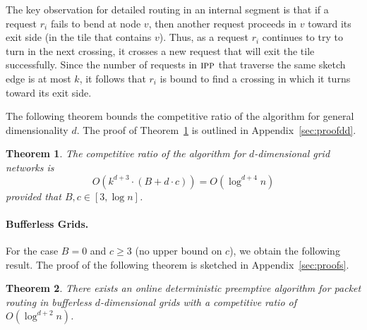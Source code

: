 \documentclass[11pt]{article}
\newtheorem{theorem}{Theorem}
\newcommand{\route}{\text{\sc{ipp}}}
\newcommand{\IPP}{\route}
\newenvironment{proof sketch}[1]{\noindent {\emph{Proof sketch of #1:}}}{\hfill \qed}
\begin{document}
\begin{enumerate}[(1)]
  The key observation for detailed routing in an internal segment is that if a
  request $r_i$ fails to bend at node $v$, then another request proceeds in $v$
  toward its exit side (in the tile that contains $v$). Thus, as a request $r_i$
  continues to try to turn in the next crossing, it crosses a new request that will
  exit the tile successfully. Since the number of requests in $\IPP$ that traverse the same sketch edge is at most $k$, it follows that $r_i$ is bound to find a crossing in which it turns
  toward its exit side.

\end{enumerate}
The following theorem bounds the competitive ratio of the algorithm for general dimensionality $d$. The proof of Theorem~\ref{thm:algd} is outlined in Appendix~\ref{sec:proofdd}.

\begin{theorem}\label{thm:algd}
  The competitive ratio of the algorithm for $d$-dimensional grid
networks is $$O\left(k^{d+3} \cdot(B+d\cdot c) \right)=O\left(
\log^{d+4} n \right)$$ provided that $B,c \in [3,\log n]$.
\end{theorem}
\begin{comment}
  \begin{proof sketch}{Theorem~\ref{thm:algd}}
    Bounding path lengths incurs a constant loss to the competitive
    ratio. Algorithm \IPP\ incurs an additional constant loss to the
    competitive ratio. The capacity assignment of $\{1,d+1\}$ reduces
    the throughput by a factor of $k^{d+1} \cdot
    \frac{\max\{B,c\}}{d+1}$. Finally, preemptions and detailed
    routing in the last tile incur a $(d+1)^3 \cdot k^2$ loss to the
    competitive ratio. The theorem follows since $B,c \in [3,\log
    n]$.
  \end{proof sketch}
\end{comment}
\label{sec:extend}
\paragraph{Bufferless Grids.}
For the case $B=0$ and $c\geq 3$ (no upper bound on $c$), we obtain
the following result. The proof of the following theorem is sketched in Appendix~\ref{sec:proofs}.
\begin{theorem}\label{thm:bufferless}
  There exists an online deterministic preemptive algorithm for packet
  routing in bufferless $d$-dimensional grids with a competitive ratio of $O(\log ^{d+2}
  n)$.
\end{theorem}
\end{document}
